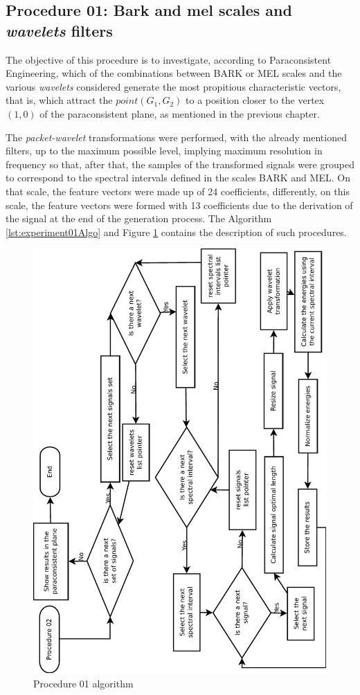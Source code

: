 		\subsection{Procedure 01: Bark and mel scales and \textit{wavelets} filters}
			\label{chap:propApproach:sec:Experimento01}
			\par The objective of this procedure is to investigate, according to Paraconsistent Engineering, which of the combinations between BARK or MEL scales and the various \textit {wavelets} considered generate the most propitious characteristic vectors, that is, which attract the $point(G_1, G_2)$ to a position closer to the vertex $(1,0)$ of the paraconsistent plane, as mentioned in the previous chapter.
			
			\par The \textit{packet-wavelet} transformations  were performed, with the already mentioned filters, up to the maximum possible level, implying maximum resolution in frequency so that, after that, the samples of the transformed signals were grouped to correspond to the spectral intervals defined in the scales BARK and MEL. On that scale, the feature vectors were made up of 24 coefficients, differently, on this scale, the feature vectors were formed with 13 coefficients due to the derivation of the signal at the end of the generation process. The Algorithm \ref{lst:experiment01Algo} and Figure \ref{fig:experiment01Algo} contains the description of such procedures.
			
			
			
			\begin{figure}[H]
				\centering
				\includegraphics[width=.83\linewidth]{images/AlgoProcedure01.pdf}
				\caption{Procedure 01 algorithm}
				\label{fig:experiment01Algo}
			\end{figure}
			
